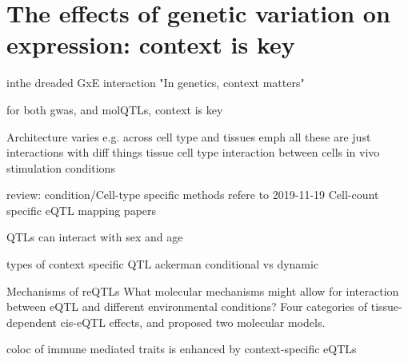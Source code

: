 \section{The effects of genetic variation on expression: context is key}

\begin{outline}

\1 inthe dreaded GxE interaction
    \2 "In genetics, context matters"

    \2 for both gwas, and molQTLs, context is key

\1 Architecture varies e.g. across cell type and tissues
\1 emph all these are just interactions with diff things
    \2 tissue
    \2 cell type
    \2 interaction between cells in vivo
    \2 stimulation conditions

review: condition/Cell-type specific methods
    refere to 2019-11-19 Cell-count specific eQTL mapping papers

\1 QTLs can interact with sex and age

\1 types of context specific QTL
    \2 ackerman conditional vs dynamic

\1 Mechanisms of reQTLs
What molecular mechanisms might allow for interaction between \Gls{eQTL} and different environmental conditions?
Four categories of tissue-dependent cis-eQTL effects, and proposed two molecular models.



coloc of immune mediated traits is enhanced by context-specific eQTLs

\end{outline}

